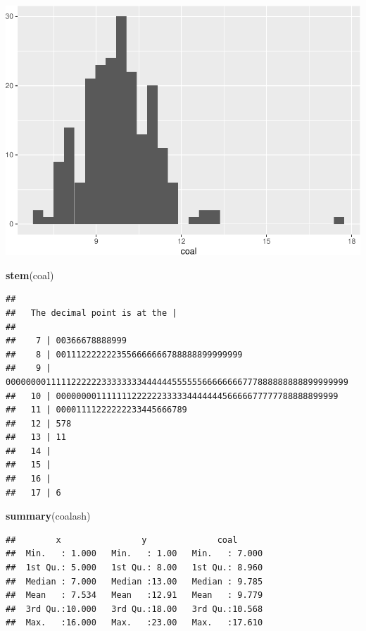 \documentclass[]{article}
\newenvironment{Shaded}{\begin{snugshade}}{\end{snugshade}}
\newcommand{\KeywordTok}[1]{\textcolor[rgb]{0.13,0.29,0.53}{\textbf{#1}}}
\newcommand{\NormalTok}[1]{#1}
\begin{document}
\includegraphics{homework2_files/figure-latex/ex7_b-1.pdf}

\begin{Shaded}
\begin{Highlighting}[]
\KeywordTok{stem}\NormalTok{(coal)}
\end{Highlighting}
\end{Shaded}

\begin{verbatim}
## 
##   The decimal point is at the |
## 
##    7 | 00366678888999
##    8 | 0011122222223556666666788888899999999
##    9 | 00000000111112222223333333344444455555566666666777888888888899999999
##   10 | 00000000111111122222233333444444456666677777788888899999
##   11 | 00001111222222233445666789
##   12 | 578
##   13 | 11
##   14 | 
##   15 | 
##   16 | 
##   17 | 6
\end{verbatim}

\begin{Shaded}
\begin{Highlighting}[]
\KeywordTok{summary}\NormalTok{(coalash)}
\end{Highlighting}
\end{Shaded}

\begin{verbatim}
##        x                y              coal       
##  Min.   : 1.000   Min.   : 1.00   Min.   : 7.000  
##  1st Qu.: 5.000   1st Qu.: 8.00   1st Qu.: 8.960  
##  Median : 7.000   Median :13.00   Median : 9.785  
##  Mean   : 7.534   Mean   :12.91   Mean   : 9.779  
##  3rd Qu.:10.000   3rd Qu.:18.00   3rd Qu.:10.568  
##  Max.   :16.000   Max.   :23.00   Max.   :17.610
\end{verbatim}
\end{document}
